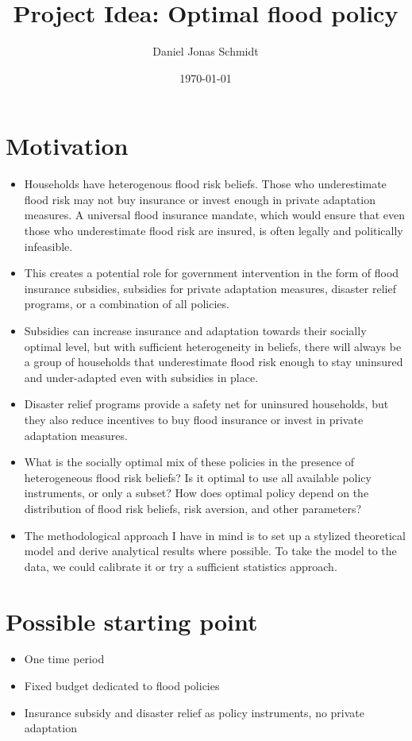\documentclass[12pt]{article}
\title{Project Idea: Optimal flood policy}
\author{Daniel Jonas Schmidt}
\date{\today}
\begin{document}
\maketitle

\section{Motivation}
\begin{itemize}
    \item Households have heterogenous flood risk beliefs. Those who underestimate flood risk may not buy insurance or invest enough in private adaptation measures. A universal flood insurance mandate, which would ensure that even those who underestimate flood risk are insured, is often legally and politically infeasible.
    \item This creates a potential role for government intervention in the form of flood insurance subsidies, subsidies for private adaptation measures, disaster relief programs, or a combination of all policies.
    \item Subsidies can increase insurance and adaptation towards their socially optimal level, but with sufficient heterogeneity in beliefs, there will always be a group of households that underestimate flood risk enough to stay uninsured and under-adapted even with subsidies in place. 
    \item Disaster relief programs provide a safety net for uninsured households, but they also reduce incentives to buy flood insurance or invest in private adaptation measures. 
    \item What is the socially optimal mix of these policies in the presence of heterogeneous flood risk beliefs? Is it optimal to use all available policy instruments, or only a subset? How does optimal policy depend on the distribution of flood risk beliefs, risk aversion, and other parameters?
    \item The methodological approach I have in mind is to set up a stylized theoretical model and derive analytical results where possible. To take the model to the data, we could calibrate it or try a sufficient statistics approach.
\end{itemize}

\section{Possible starting point}
\begin{itemize}
    \item One time period
    \item Fixed budget dedicated to flood policies
    \item Insurance subsidy and disaster relief as policy instruments, no private adaptation
\end{itemize}
\end{document}
